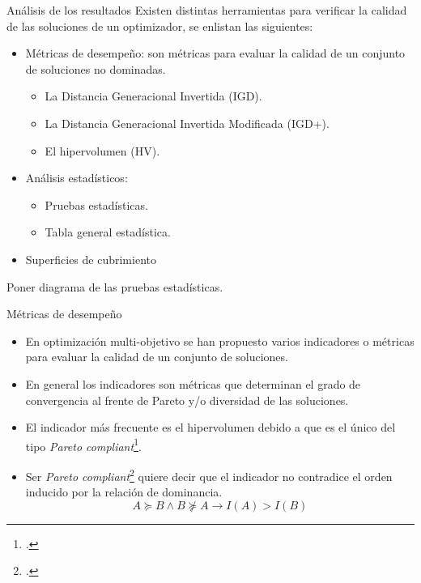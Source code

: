 \documentclass{beamer}
\begin{document}
\begin{frame}{Análisis de los resultados}
Existen distintas herramientas para verificar la calidad de las soluciones de un optimizador, se enlistan las siguientes:
\begin{itemize}
\justifying
\item Métricas de desempeño: son métricas para evaluar la calidad de un conjunto de soluciones no dominadas.
   \begin{itemize}
     \item La Distancia Generacional Invertida (IGD).
     \item La Distancia Generacional Invertida Modificada (IGD+).
     \item El hipervolumen (HV).
   \end{itemize}
\item Análisis estadísticos:
  \begin{itemize}
      \item Pruebas estadísticas.
      \item Tabla general estadística.
  \end{itemize}
  \item Superficies de cubrimiento
\end{itemize}
Poner diagrama de las pruebas estadísticas.
\end{frame}

\begin{frame}{Métricas de desempeño}
   \begin{itemize}
	\scriptsize
        \item En optimización multi-objetivo se han propuesto varios indicadores o métricas para evaluar la calidad de un conjunto de soluciones.
	\item En general los indicadores son métricas que determinan el grado de convergencia al frente de Pareto y/o diversidad de las soluciones.
	\item El indicador más frecuente es el hipervolumen debido a que es el único del tipo \textit{Pareto compliant}\footcite
{Joel:ComparativeCaseStudy}.
	\item Ser \textit{Pareto compliant}\footcite{Joel:ComparacionMetricas} quiere decir que el indicador no contradice el orden inducido por la relación de dominancia.
	\begin{equation*}
	   A \succeq B \wedge  B \not \succeq A \rightarrow I(A) > I(B)
	\end{equation*}
   \end{itemize} 
\end{frame}
\end{document}
